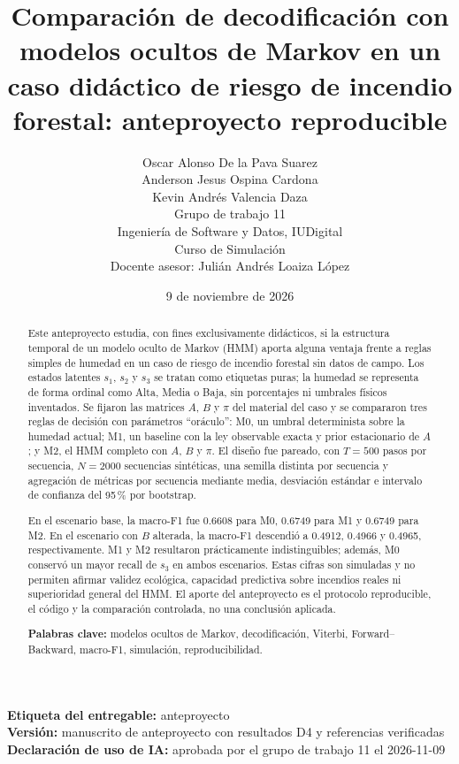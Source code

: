\documentclass[11pt,a4paper]{article}
\title{Comparación de decodificación con modelos ocultos de Markov en un caso didáctico de riesgo de incendio forestal: anteproyecto reproducible}
\author{
Oscar Alonso De la Pava Suarez\\
Anderson Jesus Ospina Cardona\\
Kevin Andrés Valencia Daza\\[0.4em]
\small Grupo de trabajo 11\\
\small Ingeniería de Software y Datos, IUDigital\\
\small Curso de Simulación\\
\small Docente asesor: Julián Andrés Loaiza López
}
\date{9 de noviembre de 2026}
\begin{document}
\maketitle

\begin{center}
\textbf{Etiqueta del entregable:} anteproyecto\\
\textbf{Versión:} manuscrito de anteproyecto con resultados D4 y referencias verificadas\\
\textbf{Declaración de uso de IA:} aprobada por el grupo de trabajo 11 el 2026-11-09
\end{center}

\begin{abstract}
\noindent
Este anteproyecto estudia, con fines exclusivamente didácticos, si la estructura temporal de un modelo oculto de Markov (HMM) aporta alguna ventaja frente a reglas simples de humedad en un caso de riesgo de incendio forestal sin datos de campo. Los estados latentes \(s_1\), \(s_2\) y \(s_3\) se tratan como etiquetas puras; la humedad se representa de forma ordinal como Alta, Media o Baja, sin porcentajes ni umbrales físicos inventados. Se fijaron las matrices \(A\), \(B\) y \(\pi\) del material del caso y se compararon tres reglas de decisión con parámetros ``oráculo'': M0, un umbral determinista sobre la humedad actual; M1, un baseline con la ley observable exacta y prior estacionario de \(A\); y M2, el HMM completo con \(A\), \(B\) y \(\pi\). El diseño fue pareado, con \(T=500\) pasos por secuencia, \(N=2000\) secuencias sintéticas, una semilla distinta por secuencia y agregación de métricas por secuencia mediante media, desviación estándar e intervalo de confianza del 95\,\% por bootstrap.

En el escenario base, la macro-F1 fue 0.6608 para M0, 0.6749 para M1 y 0.6749 para M2. En el escenario con \(B\) alterada, la macro-F1 descendió a 0.4912, 0.4966 y 0.4965, respectivamente. M1 y M2 resultaron prácticamente indistinguibles; además, M0 conservó un mayor recall de \(s_3\) en ambos escenarios. Estas cifras son simuladas y no permiten afirmar validez ecológica, capacidad predictiva sobre incendios reales ni superioridad general del HMM. El aporte del anteproyecto es el protocolo reproducible, el código y la comparación controlada, no una conclusión aplicada.

\vspace{0.5em}
\noindent\textbf{Palabras clave:} modelos ocultos de Markov, decodificación, Viterbi, Forward--Backward, macro-F1, simulación, reproducibilidad.
\end{abstract}
\end{document}
